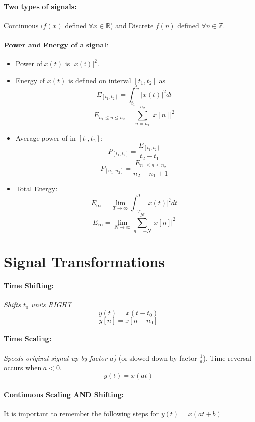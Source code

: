 \documentclass[a4paper,12pt]{report}
\def\reals{\mathbb{R}}
\def\integers{\mathbb{Z}}
\begin{document}
\paragraph{Two types of signals: } Continuous ($f(x)$ defined $\forall x \in \reals$) and Discrete $f(n)$ defined $\forall n \in \integers$.

\paragraph{Power and Energy of a signal: }
\begin{itemize}
	\item Power of $x(t)$ is $|x(t)|^2$.
	\item Energy of $x(t)$ is defined on interval $[t_1, t_2]$ as 
	$$E_{[t_1, t_2]} = \int_{t_1}^{t_2} |x(t)|^2 dt$$
	$$E_{n_1 \leq n \leq n_2} = \sum_{n=n_1}^{n_2} |x[n]|^2$$

	\item Average power of in $[t_1, t_2]$:
	$$P_{[t_1, t_2]} = \frac{E_{[t_1, t_2]}}{t_2 - t_1}$$
	$$P_{[n_1, n_2]} = \frac{E_{n_1 \leq n \leq n_2}}{n_2 - n_1 + 1}$$
	\item Total Energy: 
	$$E_{\infty} = \lim_{T\to\infty} \int_{-T}^T |x(t)|^2 dt$$
	$$E_{\infty} = \lim_{N\to\infty} \sum_{n = -N}^{N} |x[n]|^2$$
\end{itemize}


\section{Signal Transformations}

\paragraph{Time Shifting: } \textit{Shifts $t_0$ units RIGHT}
$$y(t) = x(t-t_0)$$
$$y[n] = x[n-n_0]$$

\paragraph{Time Scaling: } \textit{Speeds original signal up by factor $a$)} (or slowed down by factor $\frac{1}{a}$). Time reversal occurs when $a<0$.
$$y(t) = x(at)$$

\paragraph{Continuous Scaling AND Shifting: } It is important to remember the following steps for $y(t) = x(at+b)$
\end{document}
